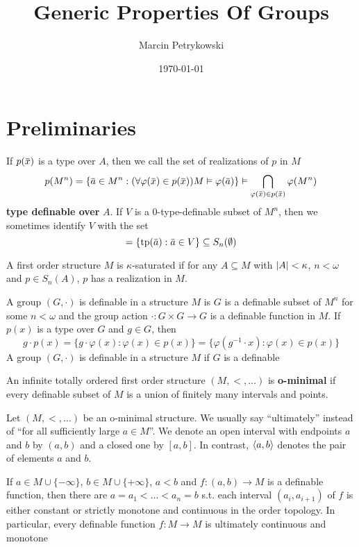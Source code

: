 \documentclass[11pt]{article}
\author{Marcin Petrykowski}
\date{\today}
\title{Generic Properties Of Groups}
\begin{document}
\maketitle
\tableofcontents


\section{Preliminaries}
\label{sec:orgf3d89dc}
If \(p(\barx)\) is a type over \(A\), then we call the set of realizations of \(p\) in \(M\)
\begin{equation*}
p(M^n)=\{\bara\in M^n:(\forall\varphi(\barx)\in p(\barx))M\vDash\varphi(\bara)\}\vDash\bigcap_{\varphi(\barx)\in p(\barx)}\varphi(M^n)
\end{equation*}
\textbf{type definable over} \(A\). If \(V\) is a 0-type-definable subset of \(M^n\), then we sometimes
 identify \(V\) with the set
 \begin{equation*}
[V]=\{\tp(\bara):\bara\in V\}\subseteq S_n(\emptyset)
 \end{equation*}

A first order structure \(M\) is \(\kappa\)-saturated if for any \(A\subseteq M\) with \(\abs{A}<\kappa\), \(n<\omega\)
and \(p\in S_n(A)\), \(p\) has a realization in \(M\).

A group \((G,\cdot)\) is definable in a structure \(M\) is \(G\) is a definable subset of \(M^n\)
for some \(n<\omega\) and the group action \(\cdot:G\times G\to G\) is a definable function in \(M\).
If \(p(x)\) is a type over \(G\) and \(g\in G\), then
 \begin{equation*}
g\cdot p(x)=\{g\cdot\varphi(x):\varphi(x)\in p(x)\}=\{\varphi(g^{-1}\cdot x):\varphi(x)\in p(x)\}
 \end{equation*}
A group \((G,\cdot)\) is definable in a structure \(M\) if \(G\) is a definable

An infinite totally ordered first order structure \((M,<,\dots)\) is \textbf{o-minimal} if every definable
subset of \(M\) is a union of finitely many intervals and points.

Let \((M,<,\dots)\) be an o-minimal structure. We usually say ``ultimately'' instead of ``for all
sufficiently large \(a\in M\)''. We denote an open interval with endpoints \(a\) and \(b\)
by \((a,b)\) and a closed one by \([a,b]\). In contrast, \(\langle a,b\rangle\) denotes the pair of
elements \(a\) and \(b\).

If \(a\in M\cup\{-\infty\}\), \(b\in M\cup\{+\infty\}\), \(a<b\) and \(f:(a,b)\to M\) is a definable function, then there
are \(a=a_1<\dots<a_n=b\) s.t. each interval \((a_i,a_{i+1})\) of \(f\) is either constant or
strictly monotone and continuous in the order topology. In particular, every definable
function \(f:M\to M\) is ultimately continuous and monotone
\end{document}
